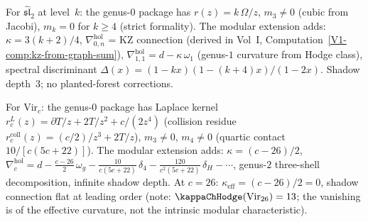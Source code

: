 \begin{computation}
For $\widehat{\mathfrak{sl}}_2$ at level~$k$: the genus-$0$
package has $r(z)=k\,\Omega/z$, $m_3\neq 0$ (cubic from Jacobi),
$m_k=0$ for $k\ge 4$ (strict formality).
The modular extension adds:
$\kappa=3(k+2)/4$,
$\nabla^{\mathrm{hol}}_{0,n}$ = KZ connection
(derived in Vol~I,
Computation~\ref*{V1-comp:kz-from-graph-sum}),
$\nabla^{\mathrm{hol}}_{1,1}=d-\kappa\,\omega_1$
(genus-$1$ curvature from Hodge class),
spectral discriminant
$\Delta(x)=(1-kx)(1-(k{+}4)x)/(1-2x)$.
Shadow depth~$3$; no planted-forest corrections.
\end{computation}

\begin{computation}
For $\mathrm{Vir}_c$: the genus-$0$ package has
Laplace kernel $r^L_c(z)=\partial T/z+2T/z^2+c/(2z^4)$
(collision residue $r^{\mathrm{coll}}_c(z)=(c/2)/z^3+2T/z$),
$m_3\neq 0$, $m_4\neq 0$
(quartic contact $10/[c(5c+22)]$).
The modular extension adds:
$\kappa=(c-26)/2$,
$\nabla^{\mathrm{hol}}_c
=d-\frac{c-26}{2}\,\omega_g
-\frac{10}{c(5c+22)}\,\delta_4
-\frac{120}{c^2(5c+22)}\,\delta_H-\cdots$,
genus-$2$ three-shell decomposition, infinite shadow depth.
At $c=26$: $\kappa_{\mathrm{eff}}=(c-26)/2=0$, shadow connection flat at leading order (note: $\kappaChHodge(\mathrm{Vir}_{26})=13$; the vanishing is of the effective curvature, not the intrinsic modular characteristic).
\end{computation}

